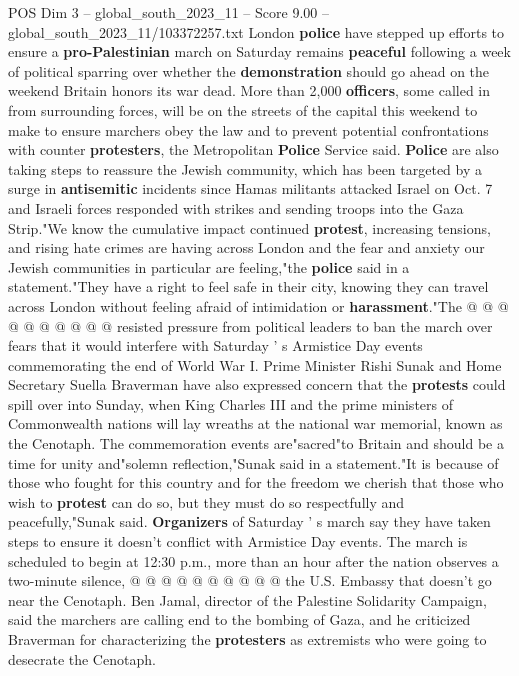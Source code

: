 \begin{textsample}{POS Dim 3 – global\_south\_2023\_11 – Score 9.00 – global\_south\_2023\_11/103372257.txt}  \label{ex:f3_pos_357}
London \textbf{police} have stepped up efforts to ensure a \textbf{pro-Palestinian} march on Saturday remains \textbf{peaceful} following a week of political sparring over whether the \textbf{demonstration} should go ahead on the weekend Britain honors its war dead.
More than 2,000 \textbf{officers}, some called in from surrounding forces, will be on the streets of the capital this weekend to make to ensure marchers obey the law and to prevent potential confrontations with counter \textbf{protesters}, the Metropolitan \textbf{Police} Service said. \textbf{Police} are also taking steps to reassure the Jewish community, which has been targeted by a surge in \textbf{antisemitic} incidents since Hamas militants attacked Israel on Oct. 7 and Israeli forces responded with strikes and sending troops into the Gaza Strip."We know the cumulative impact continued \textbf{protest}, increasing tensions, and rising hate crimes are having across London and the fear and anxiety our Jewish communities in particular are feeling,"the \textbf{police} said in a statement."They have a right to feel safe in their city, knowing they can travel across London without feeling afraid of intimidation or \textbf{harassment}."The @ @ @ @ @ @ @ @ @ @ resisted pressure from political leaders to ban the march over fears that it would interfere with Saturday ' s Armistice Day events commemorating the end of World War I.
Prime Minister Rishi Sunak and Home Secretary Suella Braverman have also expressed concern that the \textbf{protests} could spill over into Sunday, when King Charles III and the prime ministers of Commonwealth nations will lay wreaths at the national war memorial, known as the Cenotaph.
The commemoration events are"sacred"to Britain and should be a time for unity and"solemn reflection,"Sunak said in a statement."It is because of those who fought for this country and for the freedom we cherish that those who wish to \textbf{protest} can do so, but they must do so respectfully and peacefully,"Sunak said. \textbf{Organizers} of Saturday ' s march say they have taken steps to ensure it doesn't conflict with Armistice Day events.
The march is scheduled to begin at 12:30 p.m., more than an hour after the nation observes a two-minute silence, @ @ @ @ @ @ @ @ @ @ the U.S.
Embassy that doesn't go near the Cenotaph.
Ben Jamal, director of the Palestine Solidarity Campaign, said the marchers are calling end to the bombing of Gaza, and he criticized Braverman for characterizing the \textbf{protesters} as extremists who were going to desecrate the Cenotaph.

\end{textsample}
